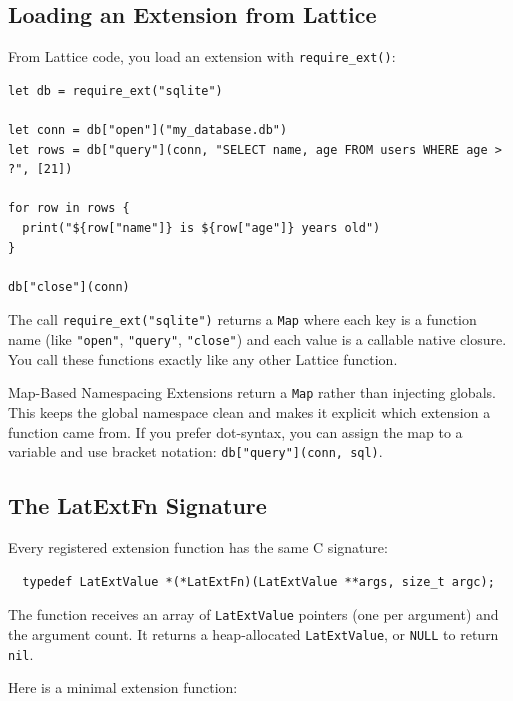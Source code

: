 \subsection{Loading an Extension from Lattice}

From Lattice code, you load an extension with \lstinline|require_ext()|:

\begin{lstlisting}[language=Lattice, caption={Loading a native extension}]
let db = require_ext("sqlite")

let conn = db["open"]("my_database.db")
let rows = db["query"](conn, "SELECT name, age FROM users WHERE age > ?", [21])

for row in rows {
  print("${row["name"]} is ${row["age"]} years old")
}

db["close"](conn)
\end{lstlisting}

The call \lstinline|require_ext("sqlite")| returns a \lstinline|Map| where each key is a function name (like \lstinline|"open"|, \lstinline|"query"|, \lstinline|"close"|) and each value is a callable native closure.
You call these functions exactly like any other Lattice function.

\begin{tipbox}{Map-Based Namespacing}
Extensions return a \lstinline|Map| rather than injecting globals.
This keeps the global namespace clean and makes it explicit which extension a function came from.
If you prefer dot-syntax, you can assign the map to a variable and use bracket notation: \lstinline|db["query"](conn, sql)|.
\end{tipbox}

\subsection{The LatExtFn Signature}

Every registered extension function has the same C signature:

\begin{verbatim}
  typedef LatExtValue *(*LatExtFn)(LatExtValue **args, size_t argc);
\end{verbatim}

The function receives an array of \lstinline|LatExtValue| pointers (one per argument) and the argument count.
It returns a heap-allocated \lstinline|LatExtValue|, or \lstinline|NULL| to return \lstinline|nil|.

Here is a minimal extension function:

